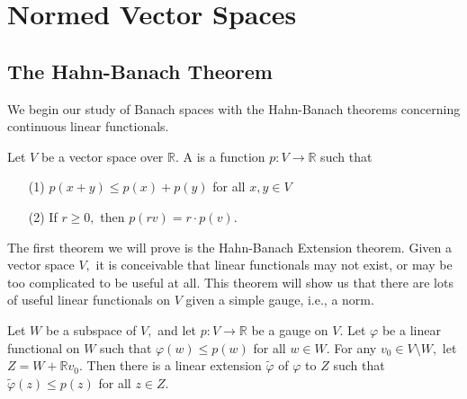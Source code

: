\chapter{Normed Vector Spaces}

\section{The Hahn-Banach Theorem}

We begin our study of Banach spaces with the Hahn-Banach theorems concerning continuous linear functionals.

\begin{defn}
Let $V$ be a vector space over $\mathbb{R}.$ A  is a function $p:V\rightarrow\mathbb{R}$ such that
\begin{enumerate}
\item[(1)] $p(x+y)\leq p(x)+p(y)$ for all $x,y\in V$
\item[(2)] If $r\geq 0,$ then $p(rv)=r\cdot p(v).$
\end{enumerate}
\end{defn}

\noindent The first theorem we will prove is the Hahn-Banach Extension theorem. Given a vector space $V,$ it is conceivable that linear functionals may not exist, or may be too complicated to be useful at all. This theorem will show us that there are lots of useful linear functionals on $V$ given a simple gauge, i.e., a norm.

\begin{lemma}
Let $W$ be a subspace of $V,$ and let $p:V\rightarrow\mathbb{R}$ be a gauge on $V.$ Let $\varphi$ be a linear functional on $W$ such that $\varphi(w)\leq p(w)$ for all $w\in W.$ For any $v_0\in V\setminus W,$ let $Z=W+\mathbb{R}v_0.$ Then there is a linear extension $\tilde{\varphi}$ of $\varphi$ to $Z$ such that $\tilde{\varphi}(z)\leq p(z)$ for all $z\in Z.$ \\
\end{lemma}

